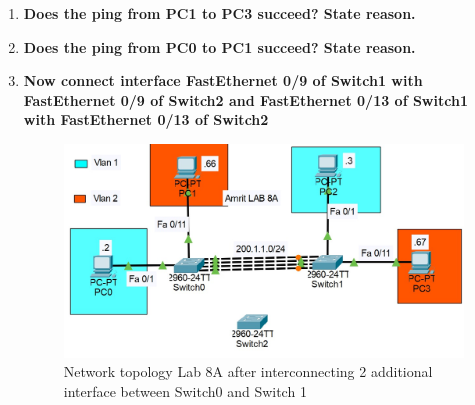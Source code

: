 \documentclass[a4paper,11pt]{article}
\begin{document}
\begin{enumerate}









    \item\textbf{ Does the ping from PC1 to PC3 succeed? State reason.}







    \item\textbf{ Does the ping from PC0 to PC1 succeed? State reason.}





    \item\textbf{ Now connect interface FastEthernet 0/9 of Switch1 with FastEthernet 0/9 of Switch2 and
              FastEthernet 0/13 of Switch1 with FastEthernet 0/13 of Switch2}

          \begin{figure}[H]
              \centering
              \includegraphics[scale=0.68,cframe=blue 0.5pt 3pt]{./FIG/Lab8A11.jpg}
              \caption{Network topology Lab 8A after interconnecting 2 additional interface between Switch0  and Switch 1 }
          \end{figure}





\end{enumerate}
\end{document}
